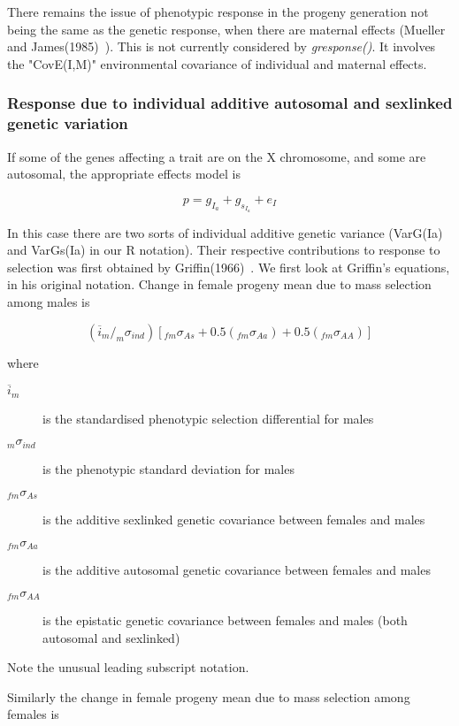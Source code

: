 \documentclass[titlepage]{article}  %
\begin{document}
There remains the issue of phenotypic response in the progeny generation not being the same as the genetic response, when there are maternal effects (Mueller and James(1985)~\cite{muel:85}). This is not currently considered by {\em gresponse()}. It involves the "CovE(I,M)" environmental covariance of individual and maternal effects.

\subsubsection{Response due to individual additive autosomal and sexlinked genetic variation}
\label{sec.sexlink}
If some of the genes affecting a trait are on the X chromosome, and some are autosomal, the appropriate effects model is 

\begin{equation}
p = g_{I_{a}} + g_{s_{I_{a}}} + e_{I} 
\end{equation}
 
In this case there are two sorts of individual additive genetic variance (VarG(Ia) and VarGs(Ia) in our R notation). Their respective contributions to response to selection was first obtained by Griffin(1966)~\cite{grif:66}. We first look at Griffin's equations, in his original notation. Change in female progeny mean due to mass selection among males is

\begin{equation}
(\overline{i}_{m}/_{m}\sigma_{ind})[_{fm}\sigma_{As} + 0.5(_{fm}\sigma_{Aa}) + 0.5(_{fm}\sigma_{AA})]
\end{equation}

where
\begin{description}
\item[$\overline{i}_{m}$] is the standardised phenotypic selection differential for males
\item[$_{m}\sigma_{ind}$] is the phenotypic standard deviation for males
\item[$_{fm}\sigma_{As}$] is the additive sexlinked genetic covariance between females and males
\item[$_{fm}\sigma_{Aa}$] is the additive autosomal genetic covariance between females and males
\item[$_{fm}\sigma_{AA}$] is the epistatic genetic covariance between females and males (both autosomal and sexlinked)
\end{description}

Note the unusual leading subscript notation.

Similarly the change in female progeny mean due to mass selection among females is
\end{document}
